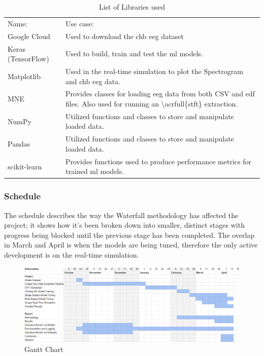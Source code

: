 \documentclass[12pt]{article}
\begin{document}
\begin{table}[H]
\centering
\begin{tabular}{p{}p{}}
Name:              & Use case:                                                                                                                               \\
Google Cloud       & Used to download the \acrshort{chb} \acrshort{eeg} dataset                                                                            \\
Keras (TensorFlow) & Used to build, train and test the \acrshort{ml} models.                                                                \\
Matplotlib         & Used in the real-time simulation to plot the Spectrogram and \acrshort{chb} \acrshort{eeg} data.                                       \\
MNE                & Provides classes for loading \acrshort{eeg} data from both CSV and \acrshort{edf} files. Also used for running an \textbackslash{}acrfull\{stft\} extraction. \\
NumPy              & Utilized functions and classes to store and manipulate loaded data.                                                                     \\
Pandas             & Utilized functions and classes to store and manipulate loaded data.                                                                     \\
scikit-learn       & Provides functions used to produce performance metrics for trained \acrshort{ml} models.                              
\end{tabular}
\caption{List of Libraries used}
\label{tab:libraries}
\end{table}


\subsubsection{Schedule}

The schedule describes the way the Waterfall methodology has affected the project; it shows how it's been broken down into smaller, distinct stages with progress being blocked until the previous stage has been completed. The overlap in March and April is when the models are being tuned, therefore the only active development is on the real-time simulation. 

\begin{figure}[H]
\includegraphics[width=\textwidth]{gantt}
\centering
\caption{Gantt Chart}
\label{fig:gantt}
\end{figure}
\end{document}

